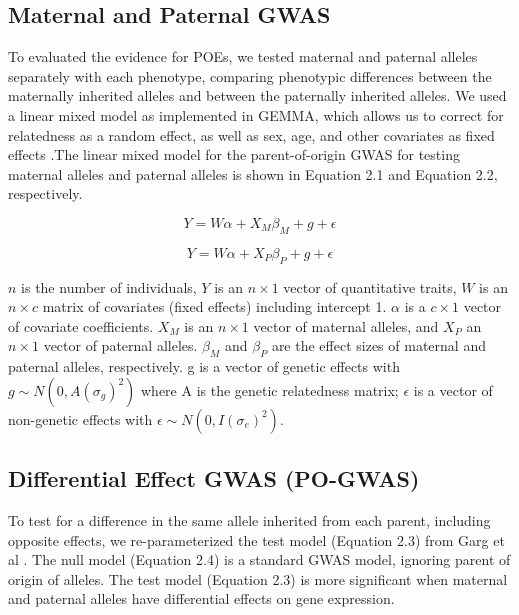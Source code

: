 \subsection{Maternal and Paternal GWAS}\label{Maternal and Paternal GWAS Methods}
To evaluated the evidence for POEs, we tested maternal and paternal alleles separately with each phenotype, comparing phenotypic differences between the maternally inherited alleles and between the paternally inherited alleles. We used a linear mixed model as implemented in GEMMA, which allows us to correct for relatedness as a random effect, as well as sex, age, and other covariates as fixed effects \cite{Zhou2012}.The linear mixed model for the parent-of-origin GWAS for testing maternal alleles and paternal alleles is shown in Equation 2.1 and Equation 2.2, respectively. 

\begin{equation}
Y =W\alpha + X_{M}\beta_{M}+g+\epsilon
\end{equation}

\begin{equation}
Y =W\alpha + X_{P}\beta_{P}+g+\epsilon
\end{equation}

$n$ is the number of individuals, $Y$ is an $n \times 1$ vector of quantitative traits, $W$ is an $n \times c$ matrix of covariates (fixed effects) including intercept 1. $\alpha$ is a $c \times 1$ vector of covariate coefficients. $X_M$  is an $n \times 1$ vector of maternal alleles, and $X_P$ an $n \times 1$ vector of paternal alleles. $\beta_M$ and $\beta_P$ are the effect sizes of maternal and paternal alleles, respectively. g is a vector of genetic effects with $g \sim N(0, A(\sigma_g)^2 )$ where A is the genetic relatedness matrix; $\epsilon$ is a vector of non-genetic effects with $\epsilon \sim N(0,I(\sigma_e)^2)$.

\subsection{Differential Effect GWAS (PO-GWAS)}\label{Differential Effect GWAS (PO-GWAS)}
To test for a difference in the same allele inherited from each parent, including opposite effects, we re-parameterized the test model (Equation 2.3) from Garg et al \cite{Garg2012a}. The null model (Equation 2.4) is a standard GWAS model, ignoring parent of origin of alleles. The test model (Equation 2.3) is more significant when maternal and paternal alleles have differential effects on gene expression.

